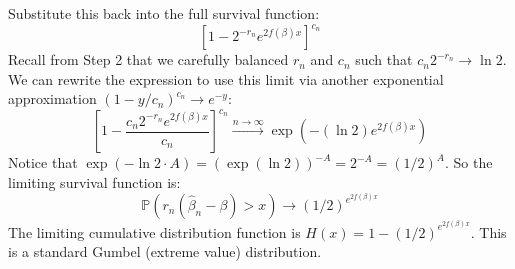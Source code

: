 \begin{solution}
Substitute this back into the full survival function:
\[ \left[ 1 - 2^{-r_n} e^{2f(\beta)x} \right]^{c_n} \]
Recall from Step 2 that we carefully balanced $r_n$ and $c_n$ such that $c_n 2^{-r_n} \to \ln 2$. We can rewrite the expression to use this limit via another exponential approximation $(1 - y/c_n)^{c_n} \to e^{-y}$:
\[ \left[ 1 - \frac{c_n 2^{-r_n} e^{2f(\beta)x}}{c_n} \right]^{c_n} \xrightarrow{n \to \infty} \exp\left( - (\ln 2) e^{2f(\beta)x} \right) \]
Notice that $\exp(-\ln 2 \cdot A) = (\exp(\ln 2))^{-A} = 2^{-A} = (1/2)^A$.
So the limiting survival function is:
\[ \mathbb{P}(r_n(\hat{\beta}_n - \beta) > x) \to (1/2)^{e^{2f(\beta)x}} \]
The limiting cumulative distribution function is $H(x) = 1 - (1/2)^{e^{2f(\beta)x}}$. This is a standard Gumbel (extreme value) distribution.
\end{solution}

